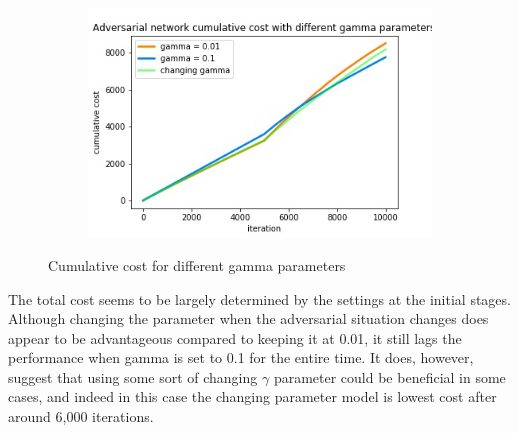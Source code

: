 \begin{figure}[h!]
\centering
\begin{subfigure}{1.0\textwidth}
  \centering
  \includegraphics[width=10cm]{../plots/changing_gamma_cumul_cost.jpg}
  \caption{}
  \label{}
\end{subfigure}
\caption{Cumulative cost for different gamma parameters}
\label{fig:ullm-particle}
\end{figure}

The total cost seems to be largely determined by the settings at the initial stages. Although changing the parameter when the adversarial situation changes does appear to be advantageous compared to keeping it at 0.01, it still lags the performance when gamma is set to 0.1 for the entire time. It does, however, suggest that using some sort of changing $\gamma$ parameter could be beneficial in some cases, and indeed in this case the changing parameter model is lowest cost after around 6,000 iterations.

\pagebreak


\appendix %



%
%





